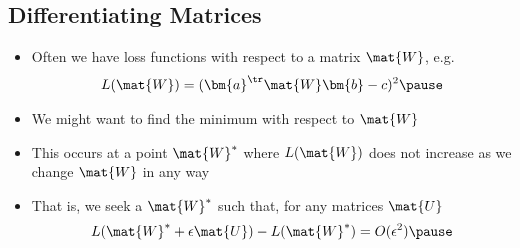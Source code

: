 \begin{slide}
\section{Differentiating Matrices}

\begin{PauseHighLight}
  \begin{itemize}
  \item Often we have loss functions with respect to a matrix
    $\mat{W}$, e.g.
    \begin{align*}
      L(\mat{W}) = (\bm{a}^\tr \mat{W} \bm{b} - c)^2\pause
    \end{align*}
  \item We might want to find the minimum with respect to
    $\mat{W}$\pause
  \item This occurs at a point $\mat{W}^*$ where $L(\mat{W})$ does not
    increase as we change $\mat{W}$ in any way\pause
  \item That is, we seek a $\mat{W}^*$ such that, for any matrices $\mat{U}$
    \begin{align*}
      L(\mat{W}^*+\epsilon \mat{U}) - L(\mat{W}^*) = O(\epsilon^2)\pause
    \end{align*}
  \end{itemize}
\end{PauseHighLight}

\end{slide}


